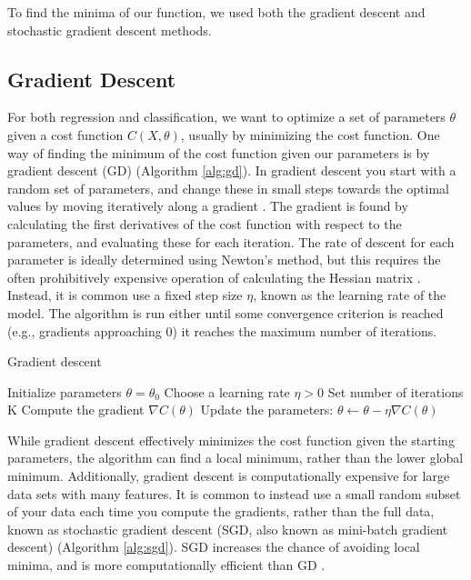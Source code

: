 To find the minima of our function, we used both the gradient descent and stochastic gradient descent methods.

\subsection{Gradient Descent}\label{ssec:gradient_descent}

For both regression and classification, we want to optimize a set of parameters $\theta$ given a cost function $C(X, \theta)$, usually by minimizing the cost function. One way of finding the minimum of the cost function given our parameters is by gradient descent (GD) (Algorithm \ref{alg:gd}). In gradient descent you start with a random set of parameters, and change these in small steps towards the optimal values by moving iteratively along a gradient \cite{Goodfellow:2016:deep_learning}. The gradient is found by calculating the first derivatives of the cost function with respect to the parameters, and evaluating these for each iteration. The rate of descent for each parameter is ideally determined using Newton's method, but this requires the often prohibitively expensive operation of calculating the Hessian matrix \cite{battiti1992:newtons_method}. Instead, it is common use a fixed step size $\eta$, known as the learning rate of the model. The algorithm is run either until some convergence criterion is reached (e.g., gradients approaching 0) it reaches the maximum number of iterations.

\begin{algorithm}
\caption{Gradient descent}\label{alg:gd}
\begin{algorithmic}[1]
    \STATE Initialize parameters $\theta = \theta_0$
    \STATE Choose a learning rate $\eta > 0$
    \STATE Set number of iterations K
        \STATE Compute the gradient $\nabla C(\theta)$
        \STATE Update the parameters: $\theta \leftarrow \theta - \eta \nabla C(\theta)$
    \ENDFOR
\end{algorithmic}
\end{algorithm}

While gradient descent effectively minimizes the cost function given the starting parameters, the algorithm can find a local minimum, rather than the lower global minimum. Additionally, gradient descent is computationally expensive for large data sets with many features. It is common to instead use a small random subset of your data each time you compute the gradients, rather than the full data, known as stochastic gradient descent (SGD, also known as mini-batch gradient descent) (Algorithm \ref{alg:sgd}). SGD increases the chance of avoiding local minima, and is more computationally efficient than GD \cite{Goodfellow:2016:deep_learning}.

